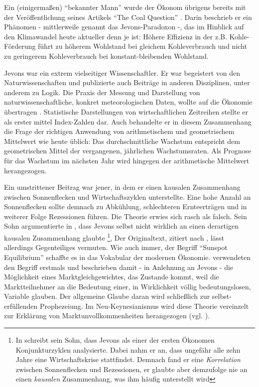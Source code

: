 Ein (einigermaßen) "`bekannter Mann"' \parencite[S. 227]{Jevons1934} wurde der Ökonom übrigens bereits mit der Veröffentlichung seines Artikels "`The Coal Question"' \parencite{Jevons1865}. Darin beschrieb er ein Phänomen - mittlerweile genannt das Jevons-Paradoxon -, das im Hinblick auf den Klimawandel heute aktueller denn je ist: Höhere Effizienz in der z.B. Kohle-Förderung führt zu höherem Wohlstand bei gleichem Kohleverbrauch und nicht zu geringerem Kohleverbrauch bei konstant-bleibenden Wohlstand.

Jevons war ein extrem vielseitiger Wissenschaftler. Er war begeistert von den Naturwissenschaften \parencite[S. 225]{Jevons1934} und publizierte auch Beiträge in anderen Disziplinen, unter anderem zu Logik. Die Praxis der Messung und Darstellung von naturwissenschaftliche, konkret meteorologischen Daten, wollte auf die Ökonomie übertragen \parencite[S. 524]{Keynes1936a}. Statistische Darstellungen von wirtschaftlichen Zeitreihen stellte er als erster mittel Index-Zahlen dar. Auch behandelte er in diesem Zusammenhang die Frage der richtigen Anwendung von arithmetischem und geometrischem Mittelwert \parencite[S. 525]{Keynes1936a} wie heute üblich: Das durchschnittliche Wachstum entspricht dem geometrischen Mittel der vergangenen, jährlichen Wachstumsraten. Als Prognose für das Wachstum im nächsten Jahr wird hingegen der arithmetische Mittelwert herangezogen.


Ein umstrittener Beitrag war jener, in dem er einen kausalen Zusammenhang zwischen Sonnenflecken und Wirtschaftszyklen unterstellte. Eine hohe Anzahl an Sonnenflecken sollte demnach zu Abkühlung, schlechteren Ernteerträgen und in weiterer Folge Rezessionen führen. Die Theorie erwies sich rasch als falsch. Sein Sohn argumentierte in \textcite[S. 229, S. 232]{Jevons1934}, dass Jevons selbst nicht wirklich an einen derartigen kausalen Zusammenhang glaubte \footnote{In \textcite[S. 232]{Jevons1934} schreibt sein Sohn, dass Jevons als einer der ersten Ökonomen Konjunkturzyklen analysierte. Dabei nahm er an, dass ungefähr alle zehn Jahre eine Wirtschaftskrise stattfindet. Demnach fand er eine \textit{Korrelation} zwischen Sonnenflecken und Rezessionen, er glaubte aber demzufolge nie an einen \textit{kausalen} Zusammenhang, was ihm häufig unterstellt wird}, Der Originaltext, zitiert nach \textcite[S. 529]{Keynes1936a}, lässt allerdings Gegenteiliges vermuten. Wie auch immer, der Begriff "`Sunspot Equilibrium"' schaffte es in das Vokabular der modernen Ökonomie. \textcite{Cass1983} verwendeten den Begriff erstmals und beschrieben damit - in Anlehnung an Jevons - die Möglichkeit eines Marktgleichgewichtes, das Zustande kommt, weil die Marktteilnehmer an die Bedeutung einer, in Wirklichkeit völlig bedeutungslosen, Variable glauben. Der allgemeine Glaube daran wird schließlich zur selbst-erfüllenden Prophezeiung. Im Neu-Keynesianismus wird diese Theorie vereinzelt zur Erklärung von Marktunvollkommenheiten herangezogen (vgl. \textcite{Woodford1990b}).

